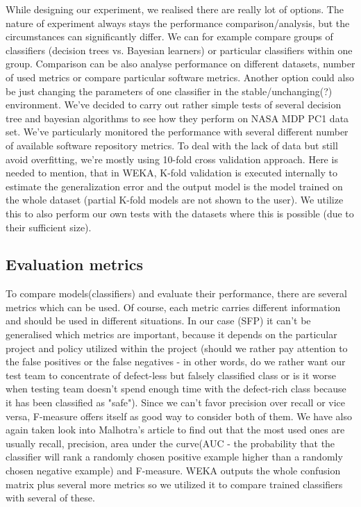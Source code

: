 While designing our experiment, we realised there are really lot of options. The nature of experiment always stays the performance comparison/analysis, but the circumstances can significantly differ. We can for example compare groups of classifiers (decision trees vs. Bayesian learners) or particular classifiers within one group. Comparison can be also analyse performance on different datasets, number of used metrics or compare particular software metrics. Another option could also be just changing the parameters of one classifier in the stable/unchanging(?) environment. We've decided to carry out rather simple tests of several decision tree and bayesian algorithms to see how they perform on NASA MDP PC1 data set. We've particularly monitored the performance with several different number of available software repository metrics. To deal with the lack of data but still avoid overfitting, we're mostly using 10-fold cross validation approach. Here is needed to mention, that in WEKA, K-fold validation is executed internally to estimate the generalization error and the output model is the model trained on the whole dataset (partial K-fold models are not shown to the user). We utilize this to also perform our own tests with the datasets where this is possible (due to their sufficient size).

\subsection{Evaluation metrics}
To compare models(classifiers) and evaluate their performance, there are several metrics which can be used. Of course, each metric carries different information and should be used in different situations. In our case (SFP) it can't be generalised which metrics are important, because it depends on the particular project and policy utilized within the project (should we rather pay attention to the false positives or the false negatives - in other words, do we rather want our test team to concentrate of defect-less but falsely classified class or is it worse when testing team doesn't spend enough time with the defect-rich class because it has been classified as "safe"). Since we can't favor precision over recall or vice versa, F-measure offers itself as good way to consider both of them. We have also again taken look into Malhotra's article\cite{malhotra2015systematic} to find out that the most used ones are usually recall, precision, area under the curve(AUC - the probability that the classifier will rank a randomly chosen positive example higher than a randomly chosen negative example\cite{japkowicz2011evaluating}) and F-measure. WEKA outputs the whole confusion matrix plus several more metrics so we utilized it to compare trained classifiers with several of these. 
